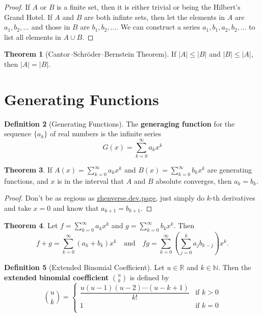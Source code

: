 \documentclass[12pt,a4paper]{report}
\theoremstyle{definition}
\newtheorem{theorem}{Theorem}[section]
\newtheorem{definition}[theorem]{Definition}
\theoremstyle{remark}
\begin{document}
\begin{proof}
    If $A$ or $B$ is a finite set, then it is either trivial or being the Hilbert's Grand Hotel. If $A$ and $B$ are both infinte sets, then let the elements in $A$ are $a_1, b_2, \ldots$ and those in $B$ are $b_1, b_2, \ldots$. We can construct a series $a_1, b_1, a_2, b_2, \ldots$ to list all elements in $A \cup B$.
\end{proof}

\begin{theorem}[Cantor–Schröder–Bernstein Theorem]
    If $|A| \leq |B|$ and $|B| \leq |A|$, then $|A| = |B|$.
\end{theorem}

\section{Generating Functions}

\begin{definition}[Generating Functions]
    The \textbf{generaging function} for the sequence $\{a_k\}$ of real numbers is the infinite series
    \[G(x) = \sum_{k = 0}^{\infty} a_k x^k\]    
\end{definition}

\begin{theorem}
    If $A(x) = \sum_{k = 0}^{\infty} a_k x^k$ and $B(x) = \sum_{k = 0}^{\infty} b_k x^k$ are generating functions, and $x$ is in the interval that $A$ and $B$ absolute converges, then $a_k = b_k$.
\end{theorem}

\begin{proof}
    Don't be as regious as \url{zhenverse.dev.page}, just simply do $k$-th derivatives and take $x = 0$ and know that $a_{k + 1} = b_{k + 1}$.
\end{proof}

\begin{theorem}
    Let $f = \sum_{k = 0}^{\infty} a_k x^k$ and $g = \sum_{k = 0}^{\infty} b_k x^k$. Then 
    \[f + g = \sum_{k = 0}^{\infty} (a_k + b_k) x^k \quad \text{and} \quad fg = \sum_{k = 0}^{\infty} \left(\sum_{j = 0}^{k}a_j b_{k - j}\right)x^k.\]
\end{theorem}

\begin{definition}[Extended Binomial Coefficient]
    Let $u \in \mathbb{R}$ and $k \in \mathbb{N}$. Then the \textbf{extended binomial coefficient} $\binom{u}{k}$ is defined by
\[
\binom{u}{k} = \begin{cases} 
  \dfrac{u(u-1)(u-2)\cdots(u-k+1)}{k!} & \text{if } k > 0 \\[8pt] 
  1 & \text{if } k = 0 \\
\end{cases}
\]
\end{definition}
\end{document}
